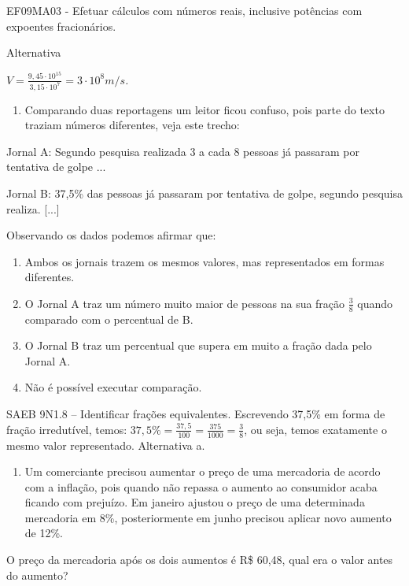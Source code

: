 \begin{escolha}
\begin{escolha}
\begin{escolha}
\begin{escolha}
{\begin{boxmedio}
\begin{boxpeq}
\begin{q°}
\begin{boxmedio}
\begin{boxpeq}
\begin{boxpeq}
\begin{boxmedio}
\begin{boxmedio}
\begin{boxmedio}
\begin{largebox}
\begin{boxmedio}
{\begin{escolha}
\begin{escolha}
\begin{escolha}
\begin{escolha}
\begin{escolha}
\begin{escolha}
{EF09MA03 - Efetuar cálculos com números reais, inclusive potências com
expoentes fracionários.

Alternativa

$V = \frac{9,45 \cdot 10^{15}}{3,15 \cdot 10^{7}} = 3 \cdot 10^{8}m/s$\emph{.}

\begin{enumerate}
\num{\arabic{enumi}.}
\setcounter{enumi}{2}
\tightlist
\item
  Comparando duas reportagens um leitor ficou confuso, pois parte do
  texto traziam números diferentes, veja este trecho:
\end{enumerate}

Jornal A: Segundo pesquisa realizada 3 a cada 8 pessoas já passaram por
tentativa de golpe ...

Jornal B: 37,5\% das pessoas já passaram por tentativa de golpe, segundo
pesquisa realiza. {[}...{]}

Observando os dados podemos afirmar que:

\begin{enumerate}

\item
  Ambos os jornais trazem os mesmos valores, mas representados em formas
  diferentes.
\item
  O Jornal A traz um número muito maior de pessoas na sua fração
  $\frac{3}{8}$ quando comparado com o percentual de B.
\item
  O Jornal B traz um percentual que supera em muito a fração dada pelo
  Jornal A.
\item
  Não é possível executar comparação.
\end{enumerate}

SAEB 9N1.8 -- Identificar frações equivalentes. Escrevendo 37,5\% em
forma de fração irredutível, temos:
$37,5\% = \frac{37,5}{100} = \frac{375}{1000} = \frac{3}{8}$, ou seja,
temos exatamente o mesmo valor representado. Alternativa a.

\begin{enumerate}
\num{\arabic{enumi}.}
\setcounter{enumi}{3}
\tightlist
\item
  Um comerciante precisou aumentar o preço de uma mercadoria de acordo
  com a inflação, pois quando não repassa o aumento ao consumidor acaba
  ficando com prejuízo. Em janeiro ajustou o preço de uma determinada
  mercadoria em 8\%, posteriormente em junho precisou aplicar novo
  aumento de 12\%.
\end{enumerate}

O preço da mercadoria após os dois aumentos é R\$ 60,48, qual era o
valor antes do aumento?

}
\end{escolha}
\end{escolha}
\end{escolha}
\end{escolha}
\end{escolha}
\end{escolha}}
\end{boxmedio}
\end{largebox}
\end{boxmedio}
\end{boxmedio}
\end{boxmedio}
\end{boxpeq}
\end{boxpeq}
\end{boxmedio}
\end{q°}
\end{boxpeq}
\end{boxmedio}}
\end{escolha}
\end{escolha}
\end{escolha}
\end{escolha}
